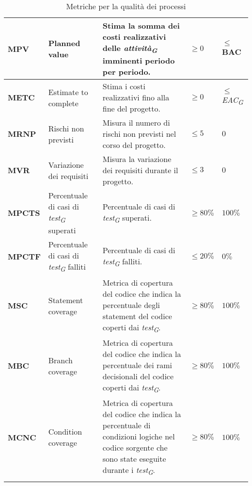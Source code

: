 \begin{longtable}{|C{1.9cm}|L{4cm}|L{4cm}|L{2.2cm}|L{2.1cm}|}
\textbf{MPV} & Planned value & Stima la somma dei costi realizzativi delle \textit{attività}\textsubscript{\textit{G}} imminenti periodo per periodo. & $\geq 0 $ & $ \leq$ BAC \\
\hline

\textbf{METC} & Estimate to complete & Stima i costi realizzativi fino alla fine del progetto. & $\geq 0 $ & $ \leq$ \textit{EAC}\textsubscript{\textit{G}} \\
\hline

\textbf{MRNP} & Rischi non previsti & Misura il numero di rischi non previsti nel corso del progetto. & $\leq 5$ & $0$ \\
\hline

\textbf{MVR} & Variazione dei requisiti & Misura la variazione dei requisiti durante il progetto. & $\leq 3$ & $0$ \\
\hline

\textbf{MPCTS} & Percentuale di casi di \textit{test}\textsubscript{\textit{G}} superati & Percentuale di casi di \textit{test}\textsubscript{\textit{G}} superati. & $\geq 80\%$ & $100\%$ \\
\hline

\textbf{MPCTF} & Percentuale di casi di \textit{test}\textsubscript{\textit{G}} falliti & Percentuale di casi di \textit{test}\textsubscript{\textit{G}} falliti. & $\leq 20\%$ & $0\%$ \\
\hline

\textbf{MSC} & Statement coverage & Metrica di copertura del codice che indica la percentuale degli statement del codice coperti dai \textit{test}\textsubscript{\textit{G}}. & $\geq 80\%$ & $100\%$ \\
\hline

\textbf{MBC} & Branch coverage & Metrica di copertura del codice che indica la percentuale dei rami decisionali del codice coperti dai \textit{test}\textsubscript{\textit{G}}. & $\geq 80\%$ & $100\%$ \\
\hline

\textbf{MCNC} & Condition coverage & Metrica di copertura del codice che indica la percentuale di condizioni logiche nel codice sorgente che sono state eseguite durante i \textit{test}\textsubscript{\textit{G}}. & $\geq 80\%$ & $100\%$ \\
\hline

\caption{Metriche per la qualità dei processi}
\label{tab:qualità_processo_progetto}
\end{longtable}

\pagebreak